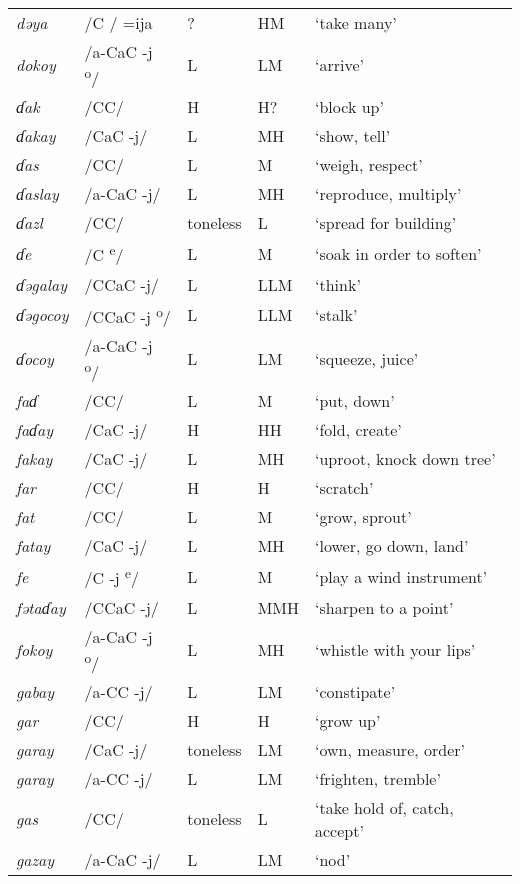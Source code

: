 \begin{small}
\begin{longtable}{lp{1.75cm}p{1.75cm}p{1.75cm}p{3cm}}
\textit{dəya} & /C / =ija & ? & HM & ‘take many’\\
\textit{dokoy} & /a-CaC -j\textsuperscript{ o}/ & L & LM & ‘arrive’\\
\textit{ɗak} & /CC/ & H & H? & ‘block up’\\
\textit{ɗakay} & /CaC -j/ & L & MH & ‘show, tell’\\
\textit{ɗas} & /CC/ & L & M & ‘weigh, respect’\\
\textit{ɗaslay} & /a-CaC -j/ & L & MH & ‘reproduce, multiply’\\
\textit{ɗazl} & /CC/ & toneless & L & ‘spread for building’\\
\textit{ɗe} & /C \textsuperscript{e}/ & L & M & ‘soak in order to soften’\\
\textit{ɗəgalay} & /CCaC -j/ & L & LLM & ‘think’\\
\textit{ɗəgocoy} & /CCaC -j\textsuperscript{ o}/ & L & LLM & ‘stalk’\\
\textit{ɗocoy} & /a-CaC -j\textsuperscript{ o}/ & L & LM & ‘squeeze, juice’\\
\textit{faɗ} & /CC/ & L & M & ‘put, down’\\
\textit{faɗay} & /CaC -j/ & H & HH & ‘fold, create’\\
\textit{fakay} & /CaC -j/ & L & MH & ‘uproot, knock down tree’\\
\textit{far} & /CC/ & H & H & ‘scratch’\\
\textit{fat} & /CC/ & L & M & ‘grow, sprout’\\
\textit{fatay} & /CaC -j/ & L & MH & ‘lower, go down, land’\\
\textit{fe} & /C -j \textsuperscript{e}/ & L & M & ‘play a wind instrument’\\
\textit{fətaɗay} & /CCaC -j/ & L & MMH & ‘sharpen to a point’\\
\textit{fok}\textit{}\textit{oy} & /a-CaC -j\textsuperscript{ o}/ & L & MH & ‘whistle with your lips’\\
\textit{gabay} & /a-CC -j/ & L & LM & ‘constipate’\\
\textit{gar} & /CC/ & H & H & ‘grow up’\\
\textit{garay} & /CaC -j/ & toneless & LM & ‘own, measure, order’\\
\textit{garay} & /a-CC -j/ & L & LM & ‘frighten, tremble’\\
\textit{gas} & /CC/ & toneless & L & ‘take hold of, catch, accept’\\
\textit{gazay} & /a-CaC -j/ & L & LM & ‘nod’\\

\end{longtable}
\end{small}
